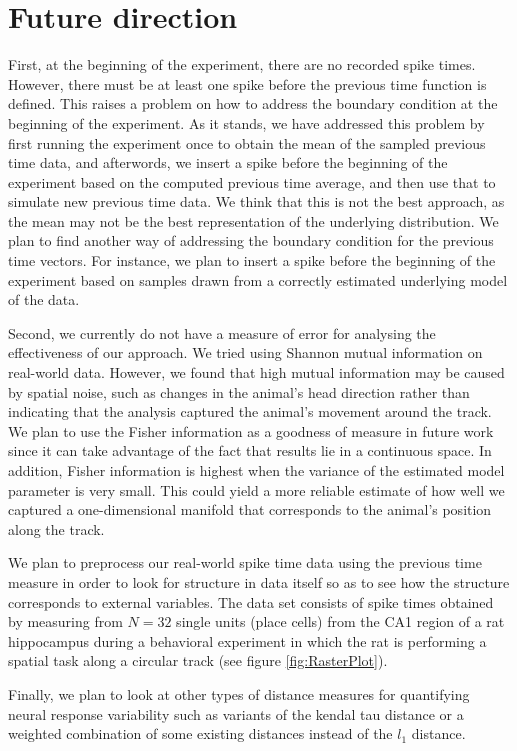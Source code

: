 \section{Future direction}
First, at the beginning of the experiment, there are no recorded spike times. However, there must be at least one spike before  the previous time function is defined. This raises a problem on how to address the boundary condition at the beginning of the experiment. As it stands, we have addressed this problem by first running the experiment once to obtain the mean of the sampled previous time data, and afterwords, we insert a spike before the beginning of the experiment based on the computed previous time average, and then use that to simulate new  previous time data. We think that this is not the best approach, as the mean may not be the best representation of the underlying distribution. We plan to find another way of addressing the boundary condition for the previous time vectors. For instance, we plan to insert a spike before the beginning of the experiment based on samples drawn from a correctly estimated underlying model of the data.


Second, we currently do not have a measure of error for analysing the  effectiveness of our approach. 
We tried using Shannon mutual information on real-world data. However, we found that  high  mutual information may be caused by spatial noise, such as changes in the animal's head direction rather than indicating that the analysis captured the animal's movement around the track.  We plan to use the Fisher information as a goodness of measure in future work since it can take advantage of the fact that results lie in a continuous space. In addition, Fisher information is highest when  the variance of the estimated model parameter is very small. This could  yield a more reliable estimate of
how well we captured a one-dimensional manifold that corresponds to the animal's position along the track. 


We plan to preprocess  our real-world spike time  data  using the previous time measure  in order to look for
structure in data itself so as to see how the structure corresponds to external variables. The  data set consists of spike times
obtained by measuring from $N = 32$ single units (place cells)  from the CA1 region of a rat hippocampus during a behavioral experiment in which the rat is performing a spatial task along a circular track (see figure \ref{fig:RasterPlot}).


Finally, we plan to look at other types of distance measures for quantifying neural response variability such as variants of the kendal tau distance  or a weighted combination of some existing distances instead of the $l_1$ distance.


